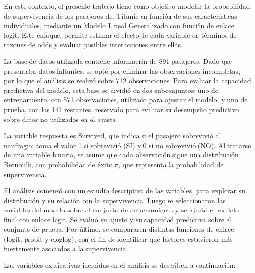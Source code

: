\documentclass[
  spanish,
  11pt,
  letterpaper,
  DIV=11,
  numbers=noendperiod]{scrartcl}
\begin{document}
En este contexto, el presente trabajo tiene como objetivo modelar la
probabilidad de supervivencia de los pasajeros del Titanic en función de
sus características individuales, mediante un Modelo Lineal Generalizado
con función de enlace logit. Este enfoque, permite estimar el efecto de
cada variable en términos de razones de odds y evaluar posibles
interacciones entre ellas.

La base de datos utilizada contiene información de 891 pasajeros. Dado
que presentaba datos faltantes, se optó por eliminar las observaciones
incompletas, por lo que el análisis se realizó sobre 712 observaciones.
Para evaluar la capacidad predictiva del modelo, esta base se dividió en
dos subconjuntos: uno de entrenamiento, con 571 observaciones, utilizado
para ajustar el modelo, y uno de prueba, con las 141 restantes,
reservado para evaluar su desempeño predictivo sobre datos no utilizados
en el ajuste.

La variable respuesta es Survived, que indica si el pasajero sobrevivió
al naufragio: toma el valor 1 si sobrevivió (SÍ) y 0 si no sobrevivió
(NO). Al tratarse de una variable binaria, se asume que cada observación
sigue una distribución Bernoulli, con probabilidad de éxito \(\pi\), que
representa la probabilidad de supervivencia.

El análisis comenzó con un estudio descriptivo de las variables, para
explorar su distribución y su relación con la supervivencia. Luego se
seleccionaron las variables del modelo sobre el conjunto de
entrenamiento y se ajustó el modelo final con enlace logit. Se evaluó su
ajuste y su capacidad predictiva sobre el conjunto de prueba. Por
último, se compararon distintas funciones de enlace (logit, probit y
cloglog), con el fin de identificar qué factores estuvieron más
fuertemente asociados a la supervivencia.

\newpage

Las variables explicativas incluidas en el análisis se describen a
continuación:
\end{document}
